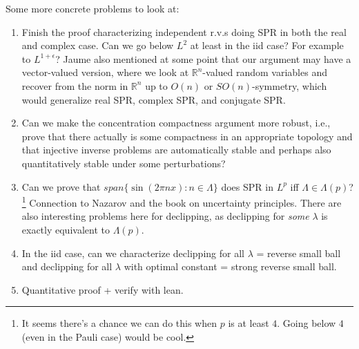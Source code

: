 \documentclass[12pt,leqno]{amsart}
\numberwithin{equation}{section}
\theoremstyle{plain}
\theoremstyle{definition}
\def\R{{\mathbb R}}
\begin{document}
Some more concrete problems to look at:
\begin{enumerate}
\item Finish the proof characterizing independent r.v.s doing SPR in both the real and complex case. Can we go below $L^2$ at least in the iid case? For example to $L^{1+\epsilon}$? Jaume also mentioned at some point that our argument may have a vector-valued version, where we look at $\R^n$-valued random variables and recover from the norm in $\mathbb{R}^n$ up to $O(n)$ or $SO(n)$-symmetry, which would generalize real SPR, complex SPR, and conjugate SPR.
\item Can we make the concentration compactness argument more robust, i.e., prove that there actually is some compactness in an appropriate topology and that injective inverse problems are automatically stable and perhaps also quantitatively stable under some perturbations?
\item Can we prove that $span\{\sin(2\pi nx) : n\in \Lambda\}$ does SPR in $L^p$ iff $\Lambda \in \Lambda(p)$?\footnote{It seems there's a chance we can do this when $p$ is at least $4$. Going below $4$ (even in the Pauli case) would be cool.} Connection to Nazarov and the book on uncertainty principles. There are also interesting problems here for declipping, as declipping for \emph{some} $\lambda$ is exactly equivalent to $\Lambda(p)$.
\item In the iid case, can we characterize declipping for all $\lambda$ = reverse small ball and declipping for all $\lambda$ with optimal constant = strong reverse small ball.
\item Quantitative proof + verify with lean.

\end{enumerate}








\end{document}
